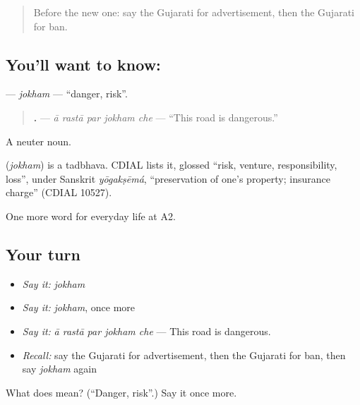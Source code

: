 \label{lesson:GU-C198-jokham}



\begin{quote}
Before the new one: say the Gujarati for advertisement, then the Gujarati for ban.
\end{quote}

\subsection*{You'll want to know: }
\textbf{} — \emph{jokham} — \textquotedblleft{}danger, risk\textquotedblright{}.

\begin{quote}
\textbf{    .} — \emph{ā rastā par jokham che} — \textquotedblleft{}This road is dangerous.\textquotedblright{}
\end{quote}

A neuter noun.

\begin{cousinweb}
\textbf{} (\emph{jokham}) is a tadbhava. CDIAL lists it, glossed \textquotedblleft{}risk, venture, responsibility, loss\textquotedblright{}, under Sanskrit \emph{yōgakṣēmá}, \textquotedblleft{}preservation of one's property; insurance charge\textquotedblright{} (CDIAL 10527).
\end{cousinweb}

\begin{grammarlens}[title={What you've built}]
One more word for everyday life at A2.
\end{grammarlens}

\subsection*{Your turn}
\begin{itemize}
\raggedright
  \item \emph{Say it:} \emph{jokham}
  \item \emph{Say it:} \emph{jokham}, once more
  \item \emph{Say it:} \emph{ā rastā par jokham che} — This road is dangerous.
  \item \emph{Recall:} say the Gujarati for advertisement, then the Gujarati for ban, then say \emph{jokham} again
\end{itemize}

\begin{tcolorbox}[breakable,colback=teal!4,colframe=teal!35!black,title={Before you move on}]
What does  mean? (\textquotedblleft{}Danger, risk\textquotedblright{}.) Say it once more.
\end{tcolorbox}
